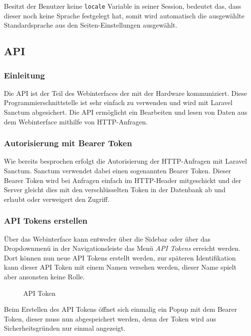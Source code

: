 Besitzt der Benutzer keine \verb|locale| Variable in seiner Session, bedeutet
das, dass dieser noch keine Sprache festgelegt hat, somit wird automatisch die
ausgewählte Standardsprache aus den Seiten-Einstellungen ausgewählt.

\subsection{API}
\subsubsection{Einleitung}
Die \ac*{API} ist der Teil des Webinterfaces der mit der Hardware kommuniziert.
Diese Programmierschnittstelle ist sehr einfach zu verwenden und wird mit
Laravel Sanctum abgesichert. Die API ermöglicht ein Bearbeiten und lesen von
Daten aus dem Webinterface mithilfe von HTTP-Anfragen.

\subsubsection{Autorisierung mit Bearer Token}
Wie bereits besprochen erfolgt die Autorisierung der HTTP-Anfragen mit Laravel
Sanctum. Sanctum verwendet dabei einen sogenannten Bearer Token. Dieser Bearer
Token wird bei Anfragen einfach im HTTP-Header mitgeschickt und
der Server gleicht dies mit den verschlüsselten Token in der Datenbank ab und
erlaubt oder verweigert den Zugriff.

\subsubsection{API Tokens erstellen}
Über das Webinterface kann entweder über die Sidebar oder über das Dropdownmenü
in der Navigationsleiste das Menü \textit{API Tokens} erreicht werden. Dort
können nun neue API Tokens erstellt werden, zur späteren Identifikation kann
dieser API Token mit einem Namen versehen werden, dieser Name spielt aber
ansonsten keine Rolle. 

\begin{figure}[H]
  \centering
  \caption{API Token}
\end{figure}

Beim Erstellen des API Tokens öffnet sich einmalig ein Popup mit dem Bearer
Token, dieser muss nun abgespeichert werden, denn der Token wird aus
Sicherheitsgründen nur einmal angezeigt.

